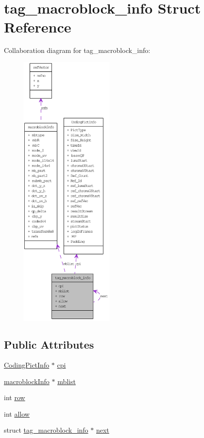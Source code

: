 \hypertarget{structtag__macroblock__info}{
\section{tag\_\-macroblock\_\-info Struct Reference}
\label{structtag__macroblock__info}
}


Collaboration diagram for tag\_\-macroblock\_\-info:\nopagebreak
\begin{figure}[H]
\begin{center}
\leavevmode
\includegraphics[height=400pt]{structtag__macroblock__info__coll__graph}
\end{center}
\end{figure}
\subsection*{Public Attributes}
\begin{DoxyCompactItemize}
\item 
\hyperlink{struct_coding_pict_info}{CodingPictInfo} $\ast$ \hyperlink{structtag__macroblock__info_ae7a0c6b68c7cbc0ffb1a82799eb386ef}{cpi}
\item 
\hyperlink{structmacroblock_info}{macroblockInfo} $\ast$ \hyperlink{structtag__macroblock__info_a150f68ca8a911ab2443199821f7b97e5}{mblist}
\item 
int \hyperlink{structtag__macroblock__info_a0431b0abc33b349505f0b83fd1537473}{row}
\item 
int \hyperlink{structtag__macroblock__info_affbe6dcc30999a24be78a7deb7a0e78b}{allow}
\item 
struct \hyperlink{structtag__macroblock__info}{tag\_\-macroblock\_\-info} $\ast$ \hyperlink{structtag__macroblock__info_ae6d03b766139a5abf281211e48c8d49b}{next}
\end{DoxyCompactItemize}


